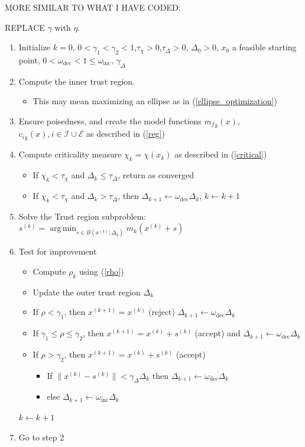 \documentclass{article}
\theoremstyle{case}
\DeclareMathOperator*{\argmin}{arg\,min}
\let\oldref\ref
\renewcommand{\ref}[1]{(\oldref{#1})}
\begin{document}
\noindent\makebox[\linewidth]{\rule{\paperwidth}{0.4pt}}

MORE SIMILAR TO WHAT I HAVE CODED:

REPLACE $\gamma$ with $\eta$.
\begin{enumerate}
    \item Initialize $k=0$, $0<\gamma_1<\gamma_2<1$,$\tau_{\chi}>0$,$\tau_{\Delta}>0$, $\Delta_0 > 0$, $x_0$ a feasible starting point, $0<\omega_{\text{dec}} < 1 \le \omega_{\text{inc}}$, $\gamma_{\Delta}$
    \item Compute the inner trust region.
    \begin{itemize}
        \item This may mean maximizing an ellipse as in \ref{ellipse_optimization}
    \end{itemize}
	\item Ensure poisedness, and create the model functions ${m_f}_k(x)$, ${c_i}_k(x), i \in \mathcal I \cup \mathcal E$ as described in \ref{reg}
	\item Compute criticality measure $\chi_k = \chi(x_k)$ as described in \ref{critical}
    \begin{itemize}
        \item If $\chi_k < \tau_{\chi}$ and $\Delta_k \le \tau_{\Delta}$, return as converged
        \item If $\chi_k < \tau_{\chi}$ and $\Delta_k > \tau_{\Delta}$, then $\Delta_{k+1} \leftarrow \omega_{\text{dec}} \Delta_k$, $k \leftarrow k + 1$
    \end{itemize}
	
	\item Solve the Trust region subproblem: $s^{(k)} = \argmin_{s\in B(x^{(k)};\Delta_k)} m_k(x^{(k)} + s)$
	
	\item Test for improvement
	\begin{itemize}
		\item Compute $\rho_k$ using \ref{rho}
    \item Update the outer trust region $\Delta_k$
		\item If $\rho < \gamma_1$, then $x^{(k+1)}=x^{(k)}$ (reject) $\Delta_{k+1} \leftarrow \omega_{\text{dec}} \Delta_k$
		\item If $\gamma_1 \le \rho \le \gamma_2$, then $x^{(k+1)}=x^{(k)}+s^{(k)}$ (accept) and $\Delta_{k+1} \leftarrow \omega_{\text{dec}} \Delta_k$
		\item If $\rho > \gamma_2$, then $x^{(k+1)}=x^{(k)}+s^{(k)}$ (accept)
		\begin{itemize}
            \item If $\|x^{(k)} - s^{(k)} \| < \gamma_{\Delta} \Delta_k$ then $\Delta_{k+1} \leftarrow \omega_{\text{dec}} \Delta_k$
            \item else $\Delta_{k+1} \leftarrow \omega_{\text{inc}} \Delta_k$
		\end{itemize}
	\end{itemize}
    $k \leftarrow k + 1$
	\item Go to step 2
\end{enumerate}
\noindent\makebox[\linewidth]{\rule{\paperwidth}{0.4pt}}
\end{document}
